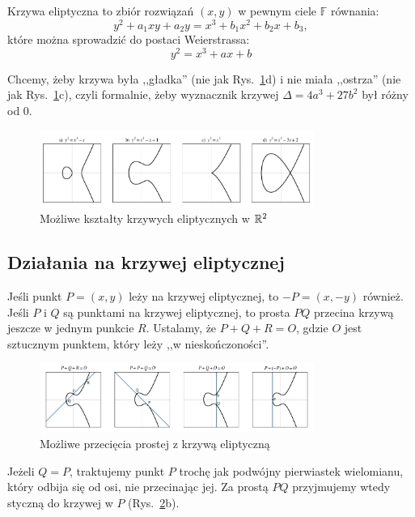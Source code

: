 \begin{definition}
    Krzywa eliptyczna to zbiór rozwiązań \( (x, y) \) w pewnym ciele \( \mathbb{F} \) równania:
    \[
        y^2 + a_1xy + a_2y = x^3 + b_1x^2 + b_2x + b_3,
    \]
    które można sprowadzić do postaci Weierstrassa:
    \[
        y^2 = x^3 + ax + b
    \]
\end{definition}

Chcemy, żeby krzywa była ,,gładka'' (nie jak Rys.~\ref{fig:elliptic_curves}d) i nie miała ,,ostrza'' (nie jak Rys.~\ref{fig:elliptic_curves}c), czyli formalnie, żeby wyznacznik krzywej \( \Delta = 4a^3 + 27b^2 \) był różny od 0.

\begin{figure}[H]
\centering
    \includegraphics[width=0.8\textwidth]{img/elliptic_curves}
    \caption{Możliwe kształty krzywych eliptycznych w \( \mathbb{R}^2 \)}
    \label{fig:elliptic_curves}
\end{figure}

\subsection{Działania na krzywej eliptycznej}
Jeśli punkt \( P = (x, y) \) leży na krzywej eliptycznej, to \( -P = (x, -y) \) również.
Jeśli \( P \) i \( Q \) są punktami na krzywej eliptycznej, to prosta \( PQ \) przecina krzywą jeszcze w jednym punkcie \( R \).
Ustalamy, że \( P + Q + R = O \), gdzie \( O \) jest sztucznym punktem, który leży ,,w nieskończoności''.

\begin{figure}[H]
\centering
    \includegraphics[width=0.8\textwidth]{img/elliptic_curves_lines}
    \caption{Możliwe przecięcia prostej z krzywą eliptyczną}
    \label{fig:elliptic_lines}
\end{figure}

Jeżeli \( Q = P \), traktujemy punkt \( P \) trochę jak podwójny pierwiastek wielomianu, który odbija się od osi, nie przecinając jej.
Za prostą \( PQ \) przyjmujemy wtedy styczną do krzywej w \( P \) (Rys.~\ref{fig:elliptic_lines}b).

